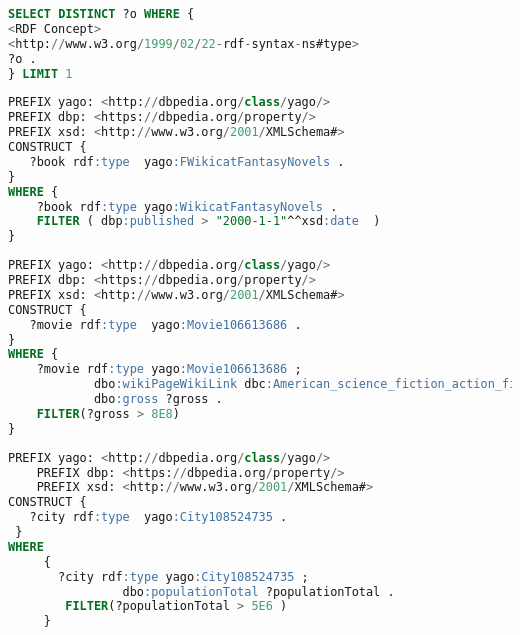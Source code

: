 \documentclass{article}
\begin{document}
\begin{lstlisting}[language=SQL, basicstyle=\footnotesize\ttfamily]
SELECT DISTINCT ?o WHERE {
<RDF Concept> 
<http://www.w3.org/1999/02/22-rdf-syntax-ns#type>
?o .
} LIMIT 1
\end{lstlisting}
\newpage
\begin{lstlisting}[language=SQL, basicstyle=\footnotesize\ttfamily]
PREFIX yago: <http://dbpedia.org/class/yago/>
PREFIX dbp: <https://dbpedia.org/property/>
PREFIX xsd: <http://www.w3.org/2001/XMLSchema#>
CONSTRUCT { 
   ?book rdf:type  yago:FWikicatFantasyNovels .
}
WHERE {
    ?book rdf:type yago:WikicatFantasyNovels .
    FILTER ( dbp:published > "2000-1-1"^^xsd:date  )
}
\end{lstlisting}

\newpage
\begin{lstlisting}[language=SQL, basicstyle=\footnotesize\ttfamily]
PREFIX yago: <http://dbpedia.org/class/yago/>
PREFIX dbp: <https://dbpedia.org/property/>
PREFIX xsd: <http://www.w3.org/2001/XMLSchema#>
CONSTRUCT { 
   ?movie rdf:type  yago:Movie106613686 .
}
WHERE {
    ?movie rdf:type yago:Movie106613686 ;
            dbo:wikiPageWikiLink dbc:American_science_fiction_action_films ;
            dbo:gross ?gross .
    FILTER(?gross > 8E8)
}
\end{lstlisting}

\newpage
\begin{lstlisting}[language=SQL, basicstyle=\footnotesize\ttfamily]
    PREFIX yago: <http://dbpedia.org/class/yago/>
    PREFIX dbp: <https://dbpedia.org/property/>
    PREFIX xsd: <http://www.w3.org/2001/XMLSchema#>    
CONSTRUCT { 
   ?city rdf:type  yago:City108524735 .
 }
WHERE
     {
       ?city rdf:type yago:City108524735 ;
                dbo:populationTotal ?populationTotal .
        FILTER(?populationTotal > 5E6 )
     }
\end{lstlisting}
\end{document}
